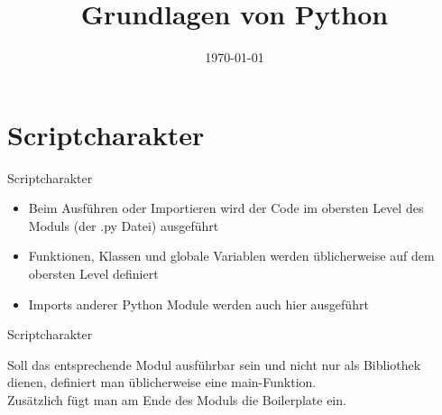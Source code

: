 

\usepackage{comment}

\newcommand{\topic}{
	Grundlagen von Python
}

\title{\topic}
\supertitle{\course}
\date{\today}



\maketitle

\begin{frame}
	\tableofcontents
\end{frame}



\section{Scriptcharakter}
\begin{frame}[fragile]{Scriptcharakter}
	\begin{itemize}
		\item Beim Ausführen oder Importieren wird der Code im obersten Level des Moduls (der .py Datei) ausgeführt
		\item Funktionen, Klassen und globale Variablen werden üblicherweise auf dem obersten Level definiert
		\item Imports anderer Python Module werden auch hier ausgeführt
	\end{itemize}
\end{frame}

\begin{frame}[fragile]{Scriptcharakter}
	
	Soll das entsprechende Modul ausführbar sein und nicht nur als Bibliothek dienen, definiert man üblicherweise eine main-Funktion.\\
	Zus\"atzlich f\"ugt man am Ende des Moduls die Boilerplate ein.\\
\end{frame}

